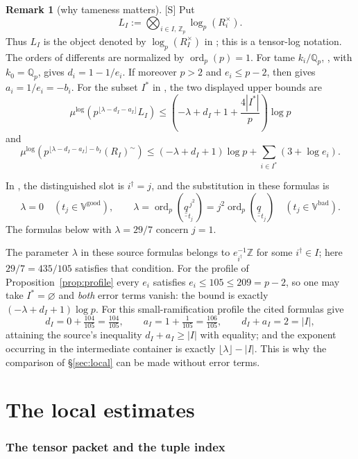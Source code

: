 \documentclass[11pt]{article}
\theoremstyle{plain}
\theoremstyle{definition}
\newtheorem{remark}[theorem]{Remark}
\newcommand{\Vbad}{\mathbb{V}^{\mathrm{bad}}}
\newcommand{\Vgood}{\mathbb{V}^{\mathrm{good}}}
\newcommand{\ord}{\operatorname{ord}}
\begin{document}
\begin{remark}[why tameness matters]\label{rem:tame}
[S] Put
\[
 L_I:=\bigotimes_{i\in I,\,\mathbb Z_p}\log_p(R_i^\times).
\]
Thus $L_I$ is the object denoted by $\log_p(R_I^\times)$ in
\cite[Proposition 1.2]{IUT4}; this is a tensor-log notation.
The orders of differents are normalized by $\ord_p(p)=1$.
For tame $k_i/\mathbb Q_p$, \cite[Proposition 1.3(i)]{IUT4},
with $k_0=\mathbb Q_p$, gives $d_i=1-1/e_i$.
If moreover $p>2$ and $e_i\le p-2$, then
\cite[Proposition 1.2]{IUT4} gives $a_i=1/e_i=-b_i$.
For the subset $I^*$ in \cite[Proposition 1.4(iii)]{IUT4},
the two displayed upper bounds are
\[
 \mu^{\log}\!\left(p^{\lfloor\lambda-d_I-a_I\rfloor}L_I\right)
 \le\left(-\lambda+d_I+1+\frac{4|I^*|}{p}\right)\log p
\]
and
\[
 \mu^{\log}\!\left(
 p^{\lfloor\lambda-d_I-a_I\rfloor-b_I}(R_I)^{\sim}\right)
 \le(-\lambda+d_I+1)\log p+
 \sum_{i\in I^*}(3+\log e_i).
\]

In \cite[Theorem 1.10, proof, Step (v)]{IUT4}, the distinguished slot
is $i^\dagger=j$, and the substitution in these formulas is
\[
 \lambda=0\quad(t_j\in\Vgood),\qquad
 \lambda=\ord_p(\underline{\underline q}_{t_j}^{\,j^2})
        =j^2\ord_p(\underline{\underline q}_{t_j})\quad(t_j\in\Vbad).
\]
The formulas below with $\lambda=29/7$ concern $j=1$.

The parameter $\lambda$ in these source formulas belongs to
$e_{i^\dagger}^{-1}\mathbb Z$ for some $i^\dagger\in I$; here
$29/7=435/105$ satisfies that condition.
For the profile of Proposition~\ref{prop:profile} every $e_i$ satisfies
$e_i\le105\le209=p-2$, so one may take $I^*=\varnothing$ and \emph{both} error
terms vanish: the bound is exactly $(-\lambda+d_I+1)\log p$.  For this small-ramification profile the cited formulas give
\[
 d_I=0+\tfrac{104}{105}=\tfrac{104}{105},\qquad
 a_I=1+\tfrac1{105}=\tfrac{106}{105},\qquad
 d_I+a_I=2=|I| ,
\]
attaining the source's inequality $d_I+a_I\ge|I|$ with equality; and the exponent
occurring in the intermediate container is exactly $\lfloor\lambda\rfloor-|I|$.
This is why the comparison of \S\ref{sec:local} can be made without error terms.
\end{remark}

\part{The local estimates}\label{part:estimates}

\section{The tensor packet and the tuple index}\label{sec:packet}
\end{document}
